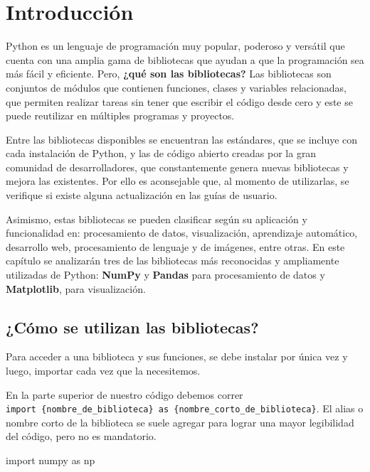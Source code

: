 \documentclass[
  letterpaper,
  DIV=11,
  numbers=noendperiod]{scrreprt}
\newenvironment{Shaded}{\begin{snugshade}}{\end{snugshade}}
\newcommand{\ImportTok}[1]{\textcolor[rgb]{0.00,0.46,0.62}{#1}}
\newcommand{\NormalTok}[1]{\textcolor[rgb]{0.00,0.23,0.31}{#1}}
\begin{document}
\section{Introducción}\label{introducciuxf3n-1}

Python es un lenguaje de programación muy popular, poderoso y versátil
que cuenta con una amplia gama de bibliotecas que ayudan a que la
programación sea más fácil y eficiente. Pero, \textbf{¿qué son las
bibliotecas?} Las bibliotecas son conjuntos de módulos que contienen
funciones, clases y variables relacionadas, que permiten realizar tareas
sin tener que escribir el código desde cero y este se puede reutilizar
en múltiples programas y proyectos.

Entre las bibliotecas disponibles se encuentran las estándares, que se
incluye con cada instalación de Python, y las de código abierto creadas
por la gran comunidad de desarrolladores, que constantemente genera
nuevas bibliotecas y mejora las existentes. Por ello es aconsejable que,
al momento de utilizarlas, se verifique si existe alguna actualización
en las guías de usuario.

Asimismo, estas bibliotecas se pueden clasificar según su aplicación y
funcionalidad en: procesamiento de datos, visualización, aprendizaje
automático, desarrollo web, procesamiento de lenguaje y de imágenes,
entre otras. En este capítulo se analizarán tres de las bibliotecas más
reconocidas y ampliamente utilizadas de Python: \textbf{NumPy} y
\textbf{Pandas} para procesamiento de datos y \textbf{Matplotlib}, para
visualización.

\subsection{¿Cómo se utilizan las
bibliotecas?}\label{cuxf3mo-se-utilizan-las-bibliotecas}

Para acceder a una biblioteca y sus funciones, se debe instalar por
única vez y luego, importar cada vez que la necesitemos.

En la parte superior de nuestro código debemos correr
\texttt{import\ \{nombre\_de\_biblioteca\}\ as\ \{nombre\_corto\_de\_biblioteca\}}.
El alias o nombre corto de la biblioteca se suele agregar para lograr
una mayor legibilidad del código, pero no es mandatorio.

\begin{Shaded}
\begin{Highlighting}[]
\ImportTok{import}\NormalTok{ numpy }\ImportTok{as}\NormalTok{ np}
\end{Highlighting}
\end{Shaded}
\end{document}
